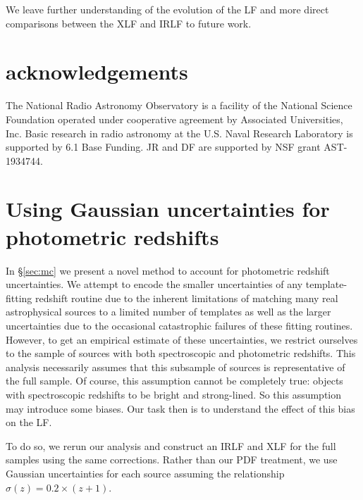 \documentclass[twocolumn, trackchanges]{aastex63}
\begin{document}
We leave further understanding of the evolution of the LF and more direct comparisons between the XLF and IRLF to future work.

\section*{acknowledgements}
The National Radio Astronomy Observatory is a facility of the National Science Foundation operated under cooperative agreement by Associated Universities, Inc.
Basic research in radio astronomy at the U.S. Naval Research Laboratory is supported by 6.1 Base Funding.
JR and DF are supported by NSF grant AST-1934744.




\appendix
\section{Using Gaussian uncertainties for photometric redshifts}
\label{app:gauss}
In \S\ref{sec:mc} we present a novel method to account for photometric redshift uncertainties.
We attempt to encode the smaller uncertainties of any template-fitting redshift routine due to the inherent limitations of matching many real astrophysical sources to a limited number of templates as well as the larger uncertainties due to the occasional catastrophic failures of these fitting routines.
However, to get an empirical estimate of these uncertainties, we restrict ourselves to the sample of sources with both spectroscopic and photometric redshifts.
This analysis necessarily assumes that this subsample of sources is representative of the full sample.
Of course, this assumption cannot be completely true: objects with spectroscopic redshifts to be bright and strong-lined.
So this assumption may introduce some biases.
Our task then is to understand the effect of this bias on the LF.

To do so, we rerun our analysis and construct an IRLF and XLF for the full samples using the same corrections.
Rather than our PDF treatment, we use Gaussian uncertainties for each source assuming the relationship $\sigma(z) = 0.2 \times (z + 1)$.
\end{document}
